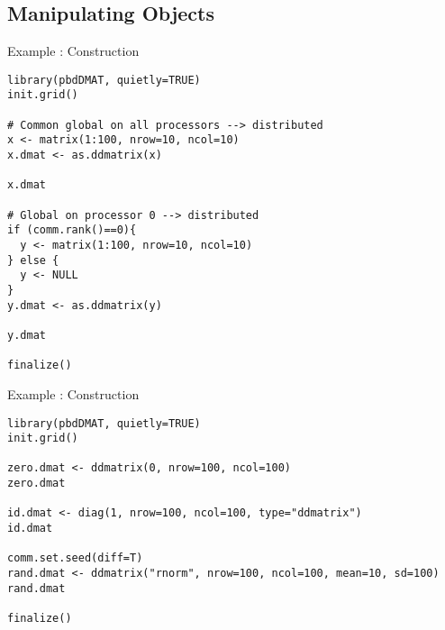 \subsection{Manipulating  Objects}
\makesubcontentsslidessec


\begin{frame}[fragile]
  \begin{exampleblock}{Example \countex:   Construction}\pause
\begin{lstlisting}[title=Generate a global matrix and distribute it]
library(pbdDMAT, quietly=TRUE)
init.grid()

# Common global on all processors --> distributed
x <- matrix(1:100, nrow=10, ncol=10)
x.dmat <- as.ddmatrix(x)

x.dmat

# Global on processor 0 --> distributed
if (comm.rank()==0){
  y <- matrix(1:100, nrow=10, ncol=10)
} else {
  y <- NULL
}
y.dmat <- as.ddmatrix(y)

y.dmat

finalize()
\end{lstlisting}
  \end{exampleblock}
\end{frame}



\begin{frame}[fragile]
  \begin{exampleblock}{Example \countex:   Construction}\pause
\begin{lstlisting}[title=Generate locally only what is needed]
library(pbdDMAT, quietly=TRUE)
init.grid()

zero.dmat <- ddmatrix(0, nrow=100, ncol=100)
zero.dmat

id.dmat <- diag(1, nrow=100, ncol=100, type="ddmatrix")
id.dmat

comm.set.seed(diff=T)
rand.dmat <- ddmatrix("rnorm", nrow=100, ncol=100, mean=10, sd=100)
rand.dmat

finalize()
\end{lstlisting}
% 
  \end{exampleblock}
\end{frame}


